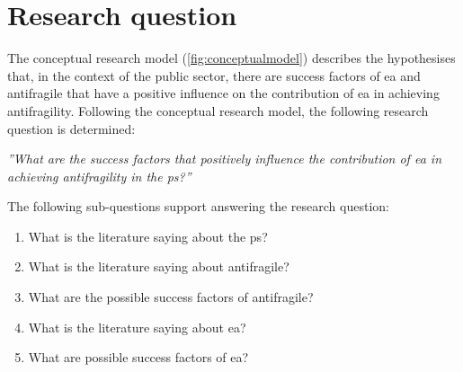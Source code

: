 \section{Research question}
\label{sec:introresearchquestion}
 The conceptual research model (\cref{fig:conceptualmodel}) describes the hypothesises that, in the context of the public sector, there are success factors of \acrshort{ea} and \gls{antifragile} that have a positive influence on the contribution of \acrlong{ea} in achieving \gls{antifragility}. Following the conceptual research model, the following research question is determined:\bigskip

\noindent \emph{''What are the success factors that positively influence the contribution of \acrlong{ea} in achieving \gls{antifragility} in the \gls{ps}?''}\bigskip

\noindent The following sub-questions support answering the research question:

\begin{enumerate}
	\item{What is the literature saying about the \gls{ps}?}
	\item{What is the literature saying about \gls{antifragile}?}
	\item{What are the possible success factors of \gls{antifragile}?}
	\item{What is the literature saying about \acrlong{ea}?}
	\item{What are possible success factors of \acrlong{ea}?}
	
\end{enumerate}
